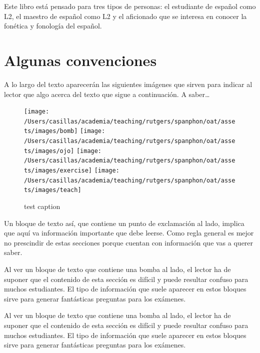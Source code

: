 \documentclass[
]{book}
\makeatletter
\newenvironment{kframe}{%
\medskip{}
\setlength{\fboxsep}{.8em}
 \def\at@end@of@kframe{}%
 \ifinner\ifhmode%
  \def\at@end@of@kframe{\end{minipage}}%
  \begin{minipage}{\columnwidth}%
 \fi\fi%
 \def\FrameCommand##1{\hskip\@totalleftmargin \hskip-\fboxsep
 \colorbox{shadecolor}{##1}\hskip-\fboxsep
     \hskip-\linewidth \hskip-\@totalleftmargin \hskip\columnwidth}%
 \MakeFramed {\advance\hsize-\width
   \@totalleftmargin\z@ \linewidth\hsize
   \@setminipage}}%
 {\par\unskip\endMakeFramed%
 \at@end@of@kframe}
\newenvironment{rmdblock}[1]
  {
  \begin{itemize}
  \renewcommand{\labelitemi}{
    \raisebox{-.7\height}[0pt][0pt]{
      {\setkeys{Gin}{width=3em,keepaspectratio}\texttt{[image: assets/images/\#1]}}
    }
  }
  \setlength{\fboxsep}{1em}
  \begin{kframe}
  \item
  }
  {
  \end{kframe}
  \end{itemize}
  }
\newenvironment{rmdojo}
  {\begin{rmdblock}{ojo}}
  {\end{rmdblock}}
\newenvironment{rmdbomb}
  {\begin{rmdblock}{bomb}}
  {\end{rmdblock}}
\newenvironment{rmdexercise}
  {\begin{rmdblock}{exercise}}
  {\end{rmdblock}}
\makeatother
\begin{document}
Este libro está pensado para tres tipos de personas: el estudiante de español
como L2, el maestro de español como L2 y el aficionado que se interesa en
conocer la fonética y fonología del español.

\hypertarget{algunas-convenciones}{%
\section*{Algunas convenciones}\label{algunas-convenciones}}

A lo largo del texto aparecerán las siguientes imágenes que sirven para indicar
al lector que algo acerca del texto que sigue a continuación.
A saber\ldots{}

\begin{figure}

{\centering \texttt{[image: /Users/casillas/academia/teaching/rutgers/spanphon/oat/assets/images/bomb]} \texttt{[image: /Users/casillas/academia/teaching/rutgers/spanphon/oat/assets/images/ojo]} \texttt{[image: /Users/casillas/academia/teaching/rutgers/spanphon/oat/assets/images/exercise]} \texttt{[image: /Users/casillas/academia/teaching/rutgers/spanphon/oat/assets/images/teach]} 

}

\caption{test caption}\label{fig:bloques}
\end{figure}

\begin{rmdojo}
Un bloque de texto así, que contiene un punto de exclamación al lado,
implica que aquí va información importante que debe leerse. Como regla
general es mejor no prescindir de estas secciones porque cuentan con
información que vas a querer saber.
\end{rmdojo}

\begin{rmdbomb}
Al ver un bloque de texto que contiene una bomba al lado, el lector ha
de suponer que el contenido de esta sección es difícil y puede resultar
confuso para muchos estudiantes. El tipo de información que suele
aparecer en estos bloques sirve para generar fantásticas preguntas para
los exámenes.
\end{rmdbomb}

\begin{rmdexercise}
Al ver un bloque de texto que contiene una bomba al lado, el lector ha
de suponer que el contenido de esta sección es difícil y puede resultar
confuso para muchos estudiantes. El tipo de información que suele
aparecer en estos bloques sirve para generar fantásticas preguntas para
los exámenes.
\end{rmdexercise}
\end{document}
